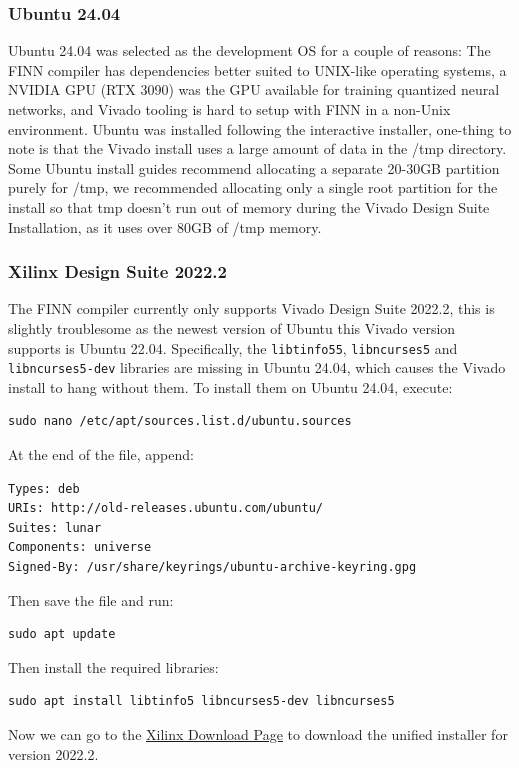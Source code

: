 \documentclass[11pt]{article}
\begin{document}
\subsubsection{Ubuntu 24.04}
Ubuntu 24.04 was selected as the development OS for a couple of reasons: The FINN compiler has dependencies better suited to UNIX-like operating systems, a NVIDIA GPU (RTX 3090) was the GPU available for training quantized neural networks, and Vivado tooling is hard to setup with FINN in a non-Unix environment.
Ubuntu was installed following the interactive installer, one-thing to note is that the Vivado install uses a large amount of data in the /tmp directory. Some Ubuntu install guides recommend allocating a separate 20-30GB partition purely for /tmp, we recommended allocating only a single root partition for the install so that tmp doesn't run out of memory during the Vivado Design Suite Installation, as it uses over 80GB of /tmp memory.
\subsubsection{Xilinx Design Suite 2022.2}
The FINN compiler currently only supports Vivado Design Suite 2022.2, this is slightly troublesome as the newest version of Ubuntu this Vivado version supports is Ubuntu 22.04.
Specifically, the \verb+libtinfo55+, \verb+libncurses5+ and \verb+libncurses5-dev+ libraries are missing in Ubuntu 24.04, which causes the Vivado install to hang without them.
To install them on Ubuntu 24.04, execute:
\begin{verbatim}
sudo nano /etc/apt/sources.list.d/ubuntu.sources
\end{verbatim}
At the end of the file, append:
\begin{verbatim}
Types: deb
URIs: http://old-releases.ubuntu.com/ubuntu/
Suites: lunar
Components: universe
Signed-By: /usr/share/keyrings/ubuntu-archive-keyring.gpg
\end{verbatim}
Then save the file and run:
\begin{verbatim}
sudo apt update
\end{verbatim}
Then install the required libraries:
\begin{verbatim}
sudo apt install libtinfo5 libncurses5-dev libncurses5
\end{verbatim}
Now we can go to the \href{https://www.xilinx.com/support/download/index.html/content/xilinx/en/downloadNav/vivado-design-tools/archive.html}{Xilinx Download Page} to download the unified installer for version 2022.2.
\end{document}
